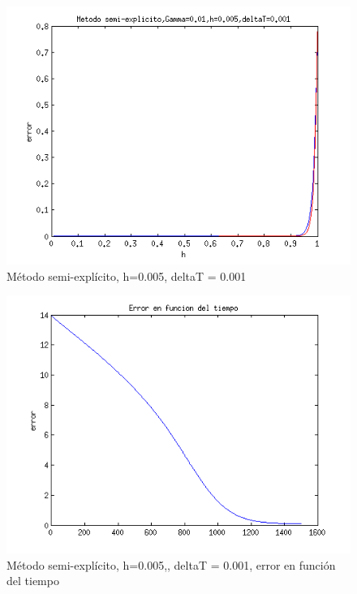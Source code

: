 \documentclass[11pt]{article}
\begin{document}
\begin{figure}[tbh]
	\centering
		\includegraphics[width=1.0\textwidth]{imagen19.png}
	\caption{M\'etodo semi-expl\'icito, h=0.005, deltaT = 0.001}
	\label{fig:Fig1}
\end{figure}

\begin{figure}[tbh]
	\centering
		\includegraphics[width=1.0\textwidth]{imagen20.png}
	\caption{M\'etodo semi-expl\'icito, h=0.005,, deltaT = 0.001, error en funci\'on del tiempo}
	\label{fig:Fig1}
\end{figure}
\end{document}
